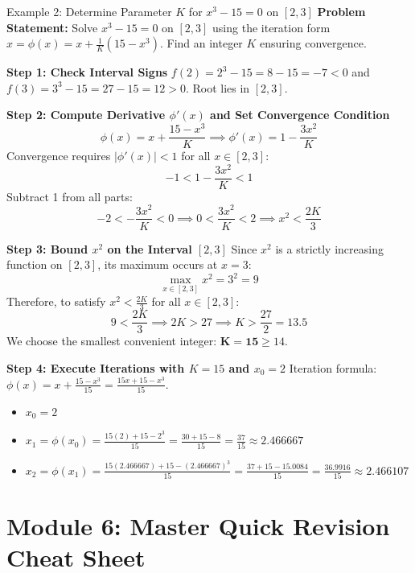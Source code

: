 \documentclass[11pt,a4paper]{article}
\begin{document}
\begin{exbox}{Example 2: Determine Parameter $K$ for $x^3 - 15 = 0$ on $[2, 3]$}
\textbf{Problem Statement:} Solve $x^3 - 15 = 0$ on $[2, 3]$ using the iteration form $x = \phi(x) = x + \frac{1}{K}(15 - x^3)$. Find an integer $K$ ensuring convergence.

\textbf{Step 1: Check Interval Signs}
$f(2) = 2^3 - 15 = 8 - 15 = -7 < 0$ and $f(3) = 3^3 - 15 = 27 - 15 = 12 > 0$. Root lies in $[2, 3]$.

\textbf{Step 2: Compute Derivative $\phi'(x)$ and Set Convergence Condition}
$$\phi(x) = x + \frac{15 - x^3}{K} \implies \phi'(x) = 1 - \frac{3x^2}{K}$$
Convergence requires $|\phi'(x)| < 1$ for all $x \in [2, 3]$:
$$-1 < 1 - \frac{3x^2}{K} < 1$$
Subtract 1 from all parts:
$$-2 < -\frac{3x^2}{K} < 0 \implies 0 < \frac{3x^2}{K} < 2 \implies x^2 < \frac{2K}{3}$$

\textbf{Step 3: Bound $x^2$ on the Interval $[2, 3]$}
Since $x^2$ is a strictly increasing function on $[2, 3]$, its maximum occurs at $x = 3$:
$$\max_{x \in [2, 3]} x^2 = 3^2 = 9$$
Therefore, to satisfy $x^2 < \frac{2K}{3}$ for all $x \in [2, 3]$:
$$9 < \frac{2K}{3} \implies 2K > 27 \implies K > \frac{27}{2} = 13.5$$
We choose the smallest convenient integer: $\mathbf{K = 15} \ge 14$.

\textbf{Step 4: Execute Iterations with $K = 15$ and $x_0 = 2$}
Iteration formula: $\phi(x) = x + \frac{15 - x^3}{15} = \frac{15x + 15 - x^3}{15}$.
\begin{itemize}
    \item $x_0 = 2$
    \item $x_1 = \phi(x_0) = \frac{15(2) + 15 - 2^3}{15} = \frac{30 + 15 - 8}{15} = \frac{37}{15} \approx \mathbf{2.466667}$
    \item $x_2 = \phi(x_1) = \frac{15(2.466667) + 15 - (2.466667)^3}{15} = \frac{37 + 15 - 15.0084}{15} = \frac{36.9916}{15} \approx \mathbf{2.466107}$
\end{itemize}
\end{exbox}

\newpage

\section{Module 6: Master Quick Revision Cheat Sheet}
\end{document}

